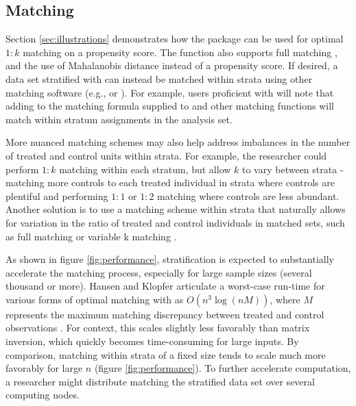 \subsection{Matching}\label{subsec:advanced_matching}

Section \ref{sec:illustrations} demonstrates how the  package can be used for optimal $1:k$ matching on a propensity score.  The  function also supports full matching \citep{hansen2006optmatch, rosenbaum1991fullmatch}, and the use of Mahalanobis distance instead of a propensity score. If desired, a data set stratified with  can instead be matched within strata using other matching software (e.g.,  \citep{hansen2006optmatch} or  \citep{ho2011matchit}).  For example, users proficient with  will note that adding  to the matching formula supplied to  and other matching functions will match within stratum assignments in the analysis set. 

More nuanced matching schemes may also help address imbalances in the number of treated and control units within strata.  For example, the researcher could perform $1:k$ matching within each stratum, but allow $k$ to vary between strata - matching more controls to each treated individual in strata where controls are plentiful and performing $1:1$ or $1:2$ matching where controls are less abundant.  Another solution is to use a matching scheme within strata that naturally allows for variation in the ratio of treated and control individuals in matched sets, such as full matching \citep{rosenbaum1991fullmatch, hansen2006optmatch} or variable k matching \citep{pimentel2015variable}.

As shown in figure \ref{fig:performance}, stratification is expected to substantially accelerate the matching process, especially for large sample sizes (several thousand or more). Hansen and Klopfer articulate a worst-case run-time for various forms of optimal matching with  as $O(n^3\log(nM))$, where $M$ represents the maximum matching discrepancy between treated and control observations \citep{hansen2006optmatch}. For context, this scales slightly less favorably than matrix inversion, which quickly becomes time-consuming for large inputs.  By comparison, matching within strata of a fixed size tends to scale much more favorably for large $n$ (figure \ref{fig:performance}). To further accelerate computation, a researcher might distribute matching the stratified data set over several computing nodes.

